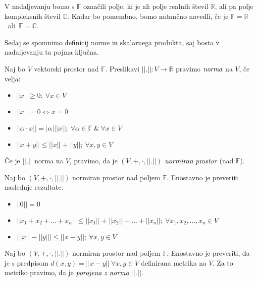 \documentclass[mat2]{matdelo}
\newcommand{\R}{\mathbb{R}}
\newcommand{\F}{\mathbb{F}}
\newcommand{\C}{\mathbb{C}}
\newcommand{\abs}[1]{\ensuremath{\lvert #1 \rvert}}
\newcommand{\norm}[1]{\abs{\abs{#1}}}
\newcommand{\pojem}[1]{\ensuremath{\emph{#1}}}
\newcommand{\map}[3]{\ensuremath{{#1}:{#2}\rightarrow{#3}}}
\begin{document}
		\begin{opomba}
			\label{op:Polj}
			V nadaljevanju bomo s $\F$ označili polje, ki je ali polje realnih števil $\R$, ali pa polje kompleksnih števil $\C$. Kadar bo pomembno, bomo natančno navedli, če je $\F = \R$~ali~$\F = \C$.
		\end{opomba}
		Sedaj se spomnimo definicij norme in skalarnega produkta, saj bosta v nadaljevanju ta pojma ključna.
		\begin{definicija}
			\label{def:Norm}
			Naj bo $V$ vektorski prostor nad $\F$. Preslikavi $\map{\norm{.}}{V}{\R}$ pravimo \pojem{norma} na $V$, če velja: \begin{itemize}
				\item $\norm{x} \geq 0;~\forall x\in V$
				\item $\norm{x} = 0 \iff x = 0$
				\item $\norm{\alpha\cdot x} = \abs{\alpha}\norm{x};~\forall \alpha\in\F~\&~\forall x\in V$
				\item $\norm{x+y} \leq \norm{x}+\norm{y};~\forall x, y\in V$
			\end{itemize}
			Če je $\norm{.}$ norma na $V$, pravimo, da je $(V, +, \cdot, \norm{.})$ \pojem{normiran prostor} (nad $\F$).
		\end{definicija}
		
		\begin{opomba}
			\label{op:Norm1}
			Naj bo $(V, +, \cdot, \norm{.})$ normiran prostor nad poljem $\F$. Enostavno je preveriti naslednje rezultate: \begin{itemize}
				\item $\norm{0} = 0$
				\item  $\norm{x_1 + x_2 + \ldots + x_n} \leq \norm{x_1} + \norm{x_2} + \ldots + \norm{x_n};~\forall x_1, x_2, \ldots, x_n\in V$
				\item $\abs{\norm{x} - \norm{y}} \leq \norm{x-y};~\forall x, y\in V$
			\end{itemize}
		\end{opomba}
		
		\begin{opomba}
			\label{op:Norm2}
			Naj bo $(V, +, \cdot, \norm{.})$ normiran prostor nad poljem $\F$. Enostavno je preveriti, da je s predpisom $d(x, y) = \norm{x - y} ~\forall x, y \in V$ definirana metrika na $V$. Za to metriko pravimo, da je \pojem{porojena z normo} $\norm{.}$.
		\end{opomba}
\end{document}
